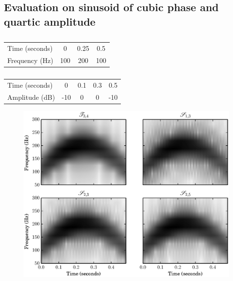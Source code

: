 \subsection{Evaluation on sinusoid of cubic phase and quartic amplitude \label{sec:evalcubicphase}}
\begin{table}
    \caption{\label{tab:cubicsinphparams}}
    \begin{center}
        \begin{tabular}{l|c c c}
            Time (seconds) & 0 & 0.25 & 0.5 \\
            Frequency (Hz) & 100 & 200 & 100
        \end{tabular}
    \end{center}
\end{table}
\begin{table}
    \caption{\label{tab:quarticsinampparams}}
    \begin{center}
        \begin{tabular}{l|c c c c}
            Time (seconds) & 0 & 0.1 & 0.3 & 0.5 \\
            Amplitude (dB) & -10 & 0 & 0 & -10
        \end{tabular}
    \end{center}
\end{table}

\begin{figure}[!t]
    \centering
    \includegraphics[width=\figwidthscale\textwidth]{plots/mq_mod_err_comp_all_spect.eps}
\end{figure}

